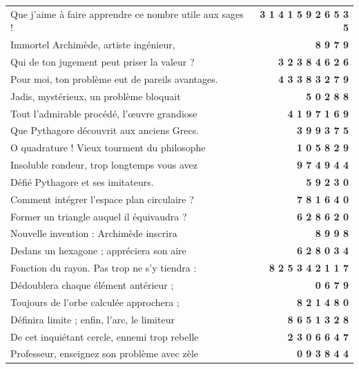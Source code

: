 \documentclass[a4paper]{book}
\begin{document}
    \begin{center}
        \renewcommand{\arraystretch}{1.3}
        \begin{tabular}{p{11cm} r}
            Que j'aime à faire apprendre ce nombre utile aux sages ! & \textbf{3 1 4 1 5 9 2 6 5 3 5} \\
            Immortel Archimède, artiste ingénieur, & \textbf{8 9 7 9} \\
            Qui de ton jugement peut priser la valeur ? & \textbf{3 2 3 8 4 6 2 6} \\
            Pour moi, ton problème eut de pareils avantages. & \textbf{4 3 3 8 3 2 7 9} \\
            Jadis, mystérieux, un problème bloquait & \textbf{5 0 2 8 8} \\
            Tout l'admirable procédé, l'œuvre grandiose & \textbf{4 1 9 7 1 6 9} \\
            Que Pythagore découvrit aux anciens Grecs. & \textbf{3 9 9 3 7 5} \\
            O quadrature ! Vieux tourment du philosophe & \textbf{1 0 5 8 2 9} \\
            Insoluble rondeur, trop longtemps vous avez & \textbf{9 7 4 9 4 4} \\
            Défié Pythagore et ses imitateurs. & \textbf{5 9 2 3 0} \\
            Comment intégrer l'espace plan circulaire ? & \textbf{7 8 1 6 4 0} \\
            Former un triangle auquel il équivaudra ? & \textbf{6 2 8 6 2 0} \\
            Nouvelle invention : Archimède inscrira & \textbf{8 9 9 8} \\
            Dedans un hexagone ; appréciera son aire & \textbf{6 2 8 0 3 4} \\
            Fonction du rayon. Pas trop ne s'y tiendra : & \textbf{8 2 5 3 4 2 1 1 7} \\
            Dédoublera chaque élément antérieur ; & \textbf{0 6 7 9} \\
            Toujours de l'orbe calculée approchera ; & \textbf{8 2 1 4 8 0} \\
            Définira limite ; enfin, l'arc, le limiteur & \textbf{8 6 5 1 3 2 8} \\
            De cet inquiétant cercle, ennemi trop rebelle & \textbf{2 3 0 6 6 4 7} \\
            Professeur, enseignez son problème avec zèle & \textbf{0 9 3 8 4 4} \\
        \end{tabular}
    \end{center}
  
\end{document}
